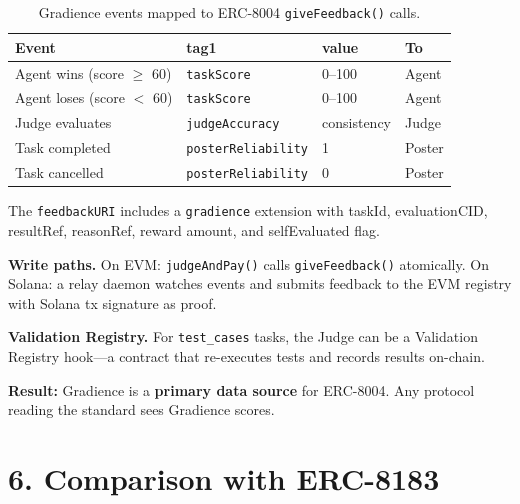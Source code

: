 \documentclass[11pt,a4paper]{article}
\begin{document}
\begin{table}[H]\centering\small
\begin{tabular}{@{}llll@{}}
\toprule
\textbf{Event} & \textbf{tag1} & \textbf{value} & \textbf{To} \\
\midrule
Agent wins (score $\geq$ 60) & \texttt{taskScore} & 0--100 & Agent \\
Agent loses (score $<$ 60) & \texttt{taskScore} & 0--100 & Agent \\
Judge evaluates & \texttt{judgeAccuracy} & consistency & Judge \\
Task completed & \texttt{posterReliability} & 1 & Poster \\
Task cancelled & \texttt{posterReliability} & 0 & Poster \\
\bottomrule
\end{tabular}
\caption{Gradience events mapped to ERC-8004 \texttt{giveFeedback()} calls.}
\end{table}

The \texttt{feedbackURI} includes a \texttt{gradience} extension with taskId, evaluationCID, resultRef, reasonRef, reward amount, and selfEvaluated flag.

\textbf{Write paths.} On EVM: \texttt{judgeAndPay()} calls \texttt{giveFeedback()} atomically. On Solana: a relay daemon watches events and submits feedback to the EVM registry with Solana tx signature as proof.

\textbf{Validation Registry.} For \texttt{test\_cases} tasks, the Judge can be a Validation Registry hook---a contract that re-executes tests and records results on-chain.

\textbf{Result:} Gradience is a \textbf{primary data source} for ERC-8004. Any protocol reading the standard sees Gradience scores.

\section{6. Comparison with ERC-8183}
\end{document}
